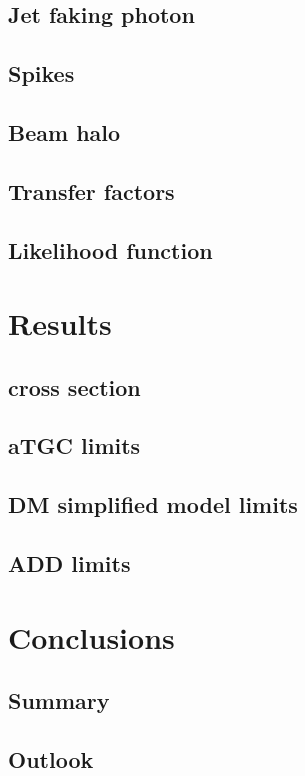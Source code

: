 \documentclass[oneside, letterpaper, 12pt, oldfontcommands]{memoir}
\begin{document}
\section{Jet faking photon} \label{sec:background_estimation_jetfake}
\section{Spikes} \label{sec:background_estimation_spikes}
\section{Beam halo} \label{sec:background_estimation_halo}
\section{Transfer factors} \label{sec:background_estimation_transfer_factors}
\section{Likelihood function} \label{sec:background_estimation_likelihood}

\chapter{Results} \label{chap:results}
\section{\texorpdfstring{\zinvg}{Z(νν)γ} cross section} \label{sec:results_znng_xsec}
\section{aTGC limits} \label{sec:results_aTGC}
\section{DM simplified model limits} \label{sec:results_DM}
\section{ADD limits} \label{sec:results_ADD}

\chapter{Conclusions} \label{chap:conclusions}
\section{Summary} \label{sec:conclusions_summary}
\section{Outlook} \label{sec:conclusions_outlook}



\end{document}
